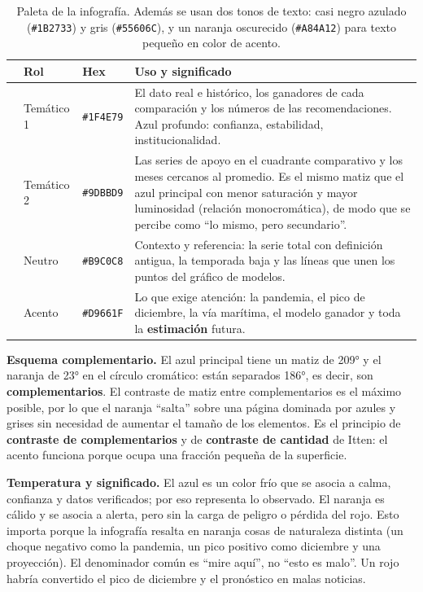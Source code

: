 \documentclass[12pt,letterpaper]{article}
\newcommand{\muestra}[1]{\textcolor{#1}{\rule{1.6em}{0.9em}}}
\begin{document}
\begin{table}[H]
\centering
\small
\begin{tabularx}{\textwidth}{cllX}
\toprule
& \textbf{Rol} & \textbf{Hex} & \textbf{Uso y significado} \\
\midrule
\muestra{azul} & Temático 1 & \texttt{\#1F4E79} & El dato real e histórico, los ganadores de cada
comparación y los números de las recomendaciones. Azul profundo: confianza, estabilidad,
institucionalidad. \\
\muestra{azulcl} & Temático 2 & \texttt{\#9DBBD9} & Las series de apoyo en el cuadrante comparativo
y los meses cercanos al promedio. Es el mismo matiz que el azul principal con menor saturación y
mayor luminosidad (relación monocromática), de modo que se percibe como ``lo mismo, pero
secundario''. \\
\muestra{gris} & Neutro & \texttt{\#B9C0C8} & Contexto y referencia: la serie total con definición
antigua, la temporada baja y las líneas que unen los puntos del gráfico de modelos. \\
\muestra{naranja} & Acento & \texttt{\#D9661F} & Lo que exige atención: la pandemia, el pico de
diciembre, la vía marítima, el modelo ganador y toda la \textbf{estimación} futura. \\
\bottomrule
\end{tabularx}
\caption{Paleta de la infografía. Además se usan dos tonos de texto: casi negro azulado
(\texttt{\#1B2733}) y gris (\texttt{\#55606C}), y un naranja oscurecido (\texttt{\#A84A12})
para texto pequeño en color de acento.}
\end{table}

\textbf{Esquema complementario.} El azul principal tiene un matiz de 209° y el naranja de 23°
en el círculo cromático: están separados 186°, es decir, son \textbf{complementarios}. El
contraste de matiz entre complementarios es el máximo posible, por lo que el naranja ``salta''
sobre una página dominada por azules y grises sin necesidad de aumentar el tamaño de los
elementos. Es el principio de \textbf{contraste de complementarios} y de \textbf{contraste de
cantidad} de Itten: el acento funciona porque ocupa una fracción pequeña de la superficie.

\textbf{Temperatura y significado.} El azul es un color frío que se asocia a calma, confianza y
datos verificados; por eso representa lo observado. El naranja es cálido y se asocia a alerta,
pero sin la carga de peligro o pérdida del rojo. Esto importa porque la infografía resalta en
naranja cosas de naturaleza distinta (un choque negativo como la pandemia, un pico positivo como
diciembre y una proyección). El denominador común es ``mire aquí'', no ``esto es malo''. Un rojo
habría convertido el pico de diciembre y el pronóstico en malas noticias.
\end{document}
